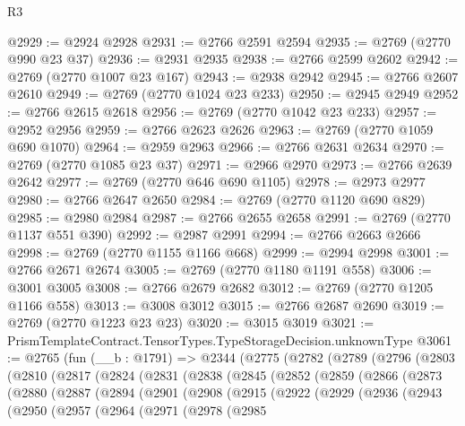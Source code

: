 \begin{lexlean}{R3}
\begin{coremodule}
@2929 := @2924 @2928
@2931 := @2766 @2591 @2594
@2935 := @2769 (@2770 @990 @23 @37)
@2936 := @2931 @2935
@2938 := @2766 @2599 @2602
@2942 := @2769 (@2770 @1007 @23 @167)
@2943 := @2938 @2942
@2945 := @2766 @2607 @2610
@2949 := @2769 (@2770 @1024 @23 @233)
@2950 := @2945 @2949
@2952 := @2766 @2615 @2618
@2956 := @2769 (@2770 @1042 @23 @233)
@2957 := @2952 @2956
@2959 := @2766 @2623 @2626
@2963 := @2769 (@2770 @1059 @690 @1070)
@2964 := @2959 @2963
@2966 := @2766 @2631 @2634
@2970 := @2769 (@2770 @1085 @23 @37)
@2971 := @2966 @2970
@2973 := @2766 @2639 @2642
@2977 := @2769 (@2770 @646 @690 @1105)
@2978 := @2973 @2977
@2980 := @2766 @2647 @2650
@2984 := @2769 (@2770 @1120 @690 @829)
@2985 := @2980 @2984
@2987 := @2766 @2655 @2658
@2991 := @2769 (@2770 @1137 @551 @390)
@2992 := @2987 @2991
@2994 := @2766 @2663 @2666
@2998 := @2769 (@2770 @1155 @1166 @668)
@2999 := @2994 @2998
@3001 := @2766 @2671 @2674
@3005 := @2769 (@2770 @1180 @1191 @558)
@3006 := @3001 @3005
@3008 := @2766 @2679 @2682
@3012 := @2769 (@2770 @1205 @1166 @558)
@3013 := @3008 @3012
@3015 := @2766 @2687 @2690
@3019 := @2769 (@2770 @1223 @23 @23)
@3020 := @3015 @3019
@3021 := PrismTemplateContract.TensorTypes.TypeStorageDecision.unknownType
@3061 := @2765
    (fun (__b : @1791) =>
    @2344
      (@2775
        (@2782
          (@2789
            (@2796
              (@2803
                (@2810
                  (@2817
                    (@2824
                      (@2831
                        (@2838
                          (@2845
                            (@2852
                              (@2859
                                (@2866
                                  (@2873
                                    (@2880
                                      (@2887
                                        (@2894
                                          (@2901
                                            (@2908
                                              (@2915
                                                (@2922
                                                  (@2929
                                                    (@2936
                                                      (@2943
                                                        (@2950
                                                          (@2957
                                                            (@2964
                                                              (@2971
                                                                (@2978
                                                                  (@2985

\end{coremodule}
\end{lexlean}
